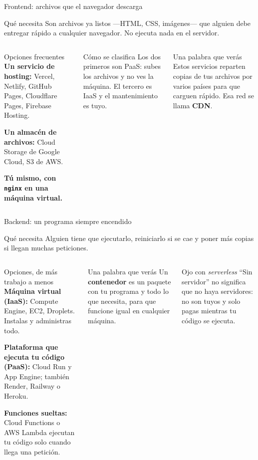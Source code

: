 \documentclass[aspectratio=169,10pt,c]{beamer}
\begin{document}
\begin{frame}{Frontend: archivos que el navegador descarga}
\begin{block}{Qué necesita}
\small Son archivos ya listos ---HTML, CSS, imágenes--- que alguien debe entregar rápido a cualquier navegador. No ejecuta nada en el servidor.
\end{block}
\begin{columns}[T,onlytextwidth]
\begin{exampleblock}{Opciones frecuentes}
\small
\textbf{Un servicio de hosting:} Vercel, Netlify, GitHub Pages, Cloudflare Pages, Firebase Hosting.\par\smallskip
\textbf{Un almacén de archivos:} Cloud Storage de Google Cloud, S3 de AWS.\par\smallskip
\textbf{Tú mismo, con \texttt{nginx} en una máquina virtual.}
\end{exampleblock}
\begin{block}{Cómo se clasifica}
\small Los dos primeros son PaaS: subes los archivos y no ves la máquina. El tercero es IaaS y el mantenimiento es tuyo.
\end{block}
\begin{alertblock}{Una palabra que verás}
\small Estos servicios reparten copias de tus archivos por varios países para que carguen rápido. Esa red se llama \textbf{CDN}.
\end{alertblock}
\end{columns}
\end{frame}

\begin{frame}{Backend: un programa siempre encendido}
\begin{block}{Qué necesita}
\small Alguien tiene que ejecutarlo, reiniciarlo si se cae y poner más copias si llegan muchas peticiones.
\end{block}
\begin{columns}[T,onlytextwidth]
\begin{exampleblock}{Opciones, de más trabajo a menos}
\small
\textbf{Máquina virtual (IaaS):} Compute Engine, EC2, Droplets. Instalas y administras todo.\par\smallskip
\textbf{Plataforma que ejecuta tu código (PaaS):} Cloud Run y App Engine; también Render, Railway o Heroku.\par\smallskip
\textbf{Funciones sueltas:} Cloud Functions o AWS Lambda ejecutan tu código solo cuando llega una petición.
\end{exampleblock}
\begin{block}{Una palabra que verás}
\small Un \textbf{contenedor} es un paquete con tu programa y todo lo que necesita, para que funcione igual en cualquier máquina.
\end{block}
\begin{alertblock}{Ojo con \emph{serverless}}
\small ``Sin servidor'' no significa que no haya servidores: no son tuyos y solo pagas mientras tu código se ejecuta.
\end{alertblock}
\end{columns}
\end{frame}
\end{document}
